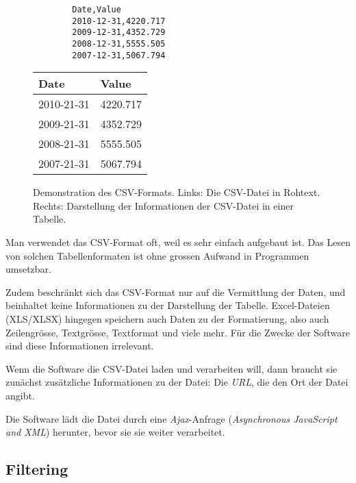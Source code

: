 \begin{figure}[!htbp]
	\centering
	\begin{minipage}{0.5\textwidth}
		\centering
		\begin{lstlisting}
		Date,Value
		2010-12-31,4220.717
		2009-12-31,4352.729
		2008-12-31,5555.505
		2007-12-31,5067.794
		\end{lstlisting}
	\end{minipage}\hfill
	\begin{minipage}{0.5\textwidth}
		\centering
		\begin{tabular}{ | l | l |}
			\hline
			\textbf{Date} & \textbf{Value} \\ \hline
			2010-21-31 & 4220.717 \\ \hline
			2009-21-31 & 4352.729 \\ \hline
			2008-21-31 & 5555.505 \\ \hline
			2007-21-31 & 5067.794 \\ \hline
		\end{tabular}
	\end{minipage}
	\caption[Demonstration des CSV-Formats]{Demonstration des CSV-Formats. Links: Die CSV-Datei in Rohtext. Rechts: Darstellung der Informationen der CSV-Datei in einer Tabelle.}
	\label{fig:csv}
\end{figure}

Man verwendet das CSV-Format oft, weil es sehr einfach aufgebaut ist. Das Lesen von solchen Tabellenformaten ist ohne grossen Aufwand in Programmen umsetzbar. 

 Zudem beschränkt sich das CSV-Format nur auf die Vermittlung der Daten, und beinhaltet keine Informationen zu der Darstellung der Tabelle. Excel-Dateien (XLS/XLSX) hingegen speichern auch Daten zu der Formatierung, also auch Zeilengrösse, Textgrösse, Textformat und viele mehr. Für die Zwecke der Software sind diese Informationen irrelevant.
 
 
Wenn die Software die CSV-Datei laden und verarbeiten will, dann braucht sie zunächst zusätzliche Informationen zu der Datei: Die \textit{URL}, die den Ort der Datei angibt.

Die Software lädt die Datei durch eine \textit{Ajax}-Anfrage (\textit{Asynchronous JavaScript and XML}) herunter, bevor sie sie weiter verarbeitet.

\subsection{Filtering}

